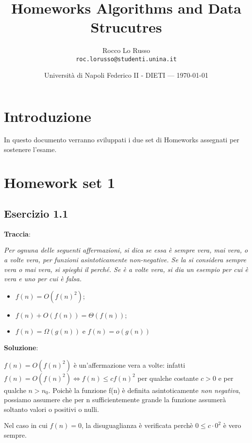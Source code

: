\documentclass{article}
\title{Homeworks Algorithms and Data Strucutres} %
\author{Rocco Lo Russo\\ \texttt{roc.lorusso@studenti.unina.it}} %
\date{Università di Napoli Federico II - DIETI --- \today} %
\begin{document}
\maketitle %


\section*{Introduzione} %
In questo documento verranno sviluppati i due set di Homeworks assegnati per sostenere l'esame.

\section{Homework set 1} \label{sec:homework_1}%
\subsection{Esercizio 1.1} \label{subsec:esercizio1_1}
\textbf{Traccia}:

\noindent
\textit{Per ognuna delle seguenti affermazioni, si dica se essa è sempre vera, mai vera, o a volte 
vera, per funzioni asintoticamente non-negative. Se la si considera sempre vera o mai vera, 
si spieghi il perché. Se è a volte vera, si dia un esempio per cui è vera e uno per cui è falsa.}
\begin{itemize}
    \item $f(n) = O(f(n)^2)$;
    \item $f(n) + O(f(n)) =  \Theta(f(n))$;
    \item $ f(n) = \Omega(g(n))$ e $f(n) = o(g(n))$
\end{itemize}
\vspace{\baselineskip}

\noindent
\textbf{Soluzione}: 

\noindent
$f(n) = O(f(n)^2) $ è un'affermazione vera a volte: infatti $f(n) = O(f(n)^2) \iff f(n) \le cf(n)^2 $ per qualche costante $ c>0 $ e per qualche $n > n_0$. Poichè la funzione f(n) è definita asintoticamente \textit{non negativa}, possiamo assumere che per n sufficientemente grande la funzione assumerà soltanto valori o positivi o nulli. 

\noindent
Nel caso in cui $f(n) = 0$, la disuguaglianza è verificata perchè $ 0 \le c \cdot 0^2$ è vero sempre. 
\end{document}

